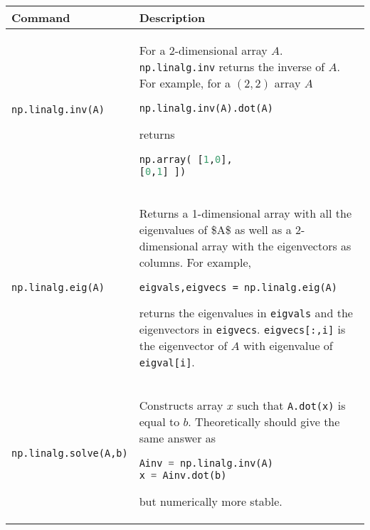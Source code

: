 \begin{tabular}[]{@{}ll@{}}
\toprule
\begin{minipage}[b]{0.19\columnwidth}\raggedright
Command
\end{minipage} & \begin{minipage}[b]{0.75\columnwidth}\raggedright
Description
\end{minipage}\tabularnewline
\midrule
\begin{minipage}[t]{0.19\columnwidth}\raggedright
\lstinline!np.linalg.inv(A)!
\end{minipage} & \begin{minipage}[t]{0.75\columnwidth}\raggedright
For a 2-dimensional array \(A\). \lstinline!np.linalg.inv! returns the
inverse of \(A\). For example, for a \((2,2)\) array \(A\)

\begin{lstlisting}[language=Python]
np.linalg.inv(A).dot(A)
\end{lstlisting}

returns

\begin{lstlisting}[language=Python]
np.array( [1,0],
[0,1] ])
\end{lstlisting}

\end{minipage}\tabularnewline
\begin{minipage}[t]{0.19\columnwidth}\raggedright
\lstinline!np.linalg.eig(A)!
\end{minipage} & \begin{minipage}[t]{0.75\columnwidth}\raggedright
Returns a 1-dimensional array with all the eigenvalues of \$A\$ as well
as a 2-dimensional array with the eigenvectors as columns. For example,

\lstinline!eigvals,eigvecs = np.linalg.eig(A)!

returns the eigenvalues in \lstinline!eigvals! and the eigenvectors in
\lstinline!eigvecs!. \lstinline!eigvecs[:,i]! is the eigenvector of
\(A\) with eigenvalue of \lstinline!eigval[i]!.
\end{minipage}\tabularnewline
\begin{minipage}[t]{0.19\columnwidth}\raggedright
\lstinline!np.linalg.solve(A,b)!
\end{minipage} & \begin{minipage}[t]{0.75\columnwidth}\raggedright
Constructs array \(x\) such that \lstinline!A.dot(x)! is equal to \(b\).
Theoretically should give the same answer as

\begin{lstlisting}[language=Python]
Ainv = np.linalg.inv(A)
x = Ainv.dot(b)
\end{lstlisting}

but numerically more stable.
\end{minipage}\tabularnewline
\bottomrule
\end{tabular}

